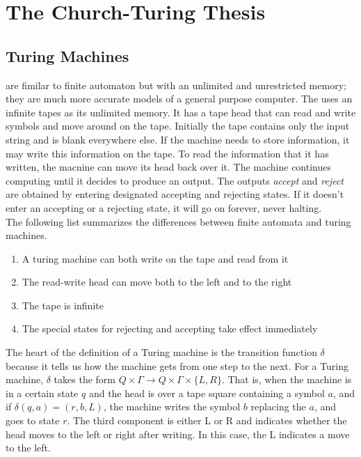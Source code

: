 \documentclass{article}
\begin{document}
\section{The Church-Turing Thesis}

\subsection{Turing Machines}

 are fimilar to finite automaton but with an unlimited and unrestricted memory; they are much more accurate models of a general purpose computer. The  uses an infinite tapes as its unlimited memory. It has a tape head that can read and write symbols and move around on the tape. Initially the tape contains only the input string and is blank everywhere else. If the machine needs to store information, it may write this information on the tape. To read the information that it has written, the macnine can move its head back over it. The machine continues computing until it decides to produce an output. The outputs \emph{accept} and \emph{reject} are obtained by entering designated accepting and rejecting states. If it doesn't enter an accepting or a rejecting state, it will go on forever, never halting. \\ 

The following list summarizes the differences between finite automata and turing machines. 
\begin{enumerate}
  \item A turing machine can both write on the tape and read from it 
  \item The read-write head can move both to the left and to the right  
  \item The tape is infinite 
  \item The special states for rejecting and accepting take effect immediately
\end{enumerate}

The heart of the definition of a Turing machine is the transition function $\delta$ because it tells us how the machine gets from one step to the next. For a Turing machine, $\delta$ takes the form $Q \times \Gamma \rightarrow Q \times \Gamma \times \{L,R\}$. That is, when the machine is in a certain state $q$ and the head is over a tape square containing a symbol $a$, and if $\delta(q,a) = (r,b,L)$, the machine writes the symbol $b$ replacing the $a$, and goes to state $r$. The third component is either L or R and indicates whether the head moves to the left or right after writing. In this case, the L indicates a move to the left. 
\end{document}

